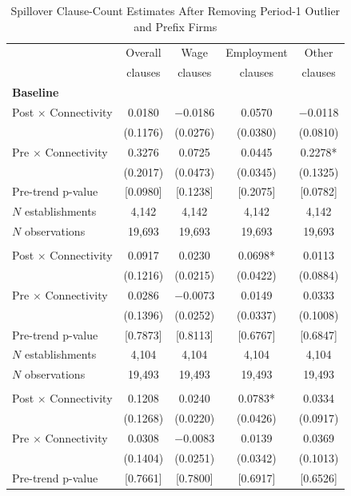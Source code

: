 \begin{table}[!htbp]
\centering
\caption{Spillover Clause-Count Estimates After Removing Period-1 Outlier and Prefix Firms}
\label{tab:numb_clause_outlier_spillover_results}
\scriptsize
\begin{tabular}{lcccc}
\toprule
 & Overall & Wage & Employment & Other \\
 & clauses & clauses & clauses & clauses \\
\midrule
\multicolumn{5}{l}{\textbf{Baseline}}\\
Post $\times$ Connectivity & 0.0180 & $-$0.0186 & 0.0570 & $-$0.0118\\
 & (0.1176) & (0.0276) & (0.0380) & (0.0810)\\
Pre $\times$ Connectivity & 0.3276 & 0.0725 & 0.0445 & 0.2278*\\
 & (0.2017) & (0.0473) & (0.0345) & (0.1325)\\
Pre-trend p-value & [0.0980] & [0.1238] & [0.2075] & [0.0782]\\
$N$ establishments & 4{,}142 & 4{,}142 & 4{,}142 & 4{,}142\\
$N$ observations & 19{,}693 & 19{,}693 & 19{,}693 & 19{,}693\\
\addlinespace
\multicolumn{5}{l}{\textbf{Drop top-1\% firms}}\\
Post $\times$ Connectivity & 0.0917 & 0.0230 & 0.0698* & 0.0113\\
 & (0.1216) & (0.0215) & (0.0422) & (0.0884)\\
Pre $\times$ Connectivity & 0.0286 & $-$0.0073 & 0.0149 & 0.0333\\
 & (0.1396) & (0.0252) & (0.0337) & (0.1008)\\
Pre-trend p-value & [0.7873] & [0.8113] & [0.6767] & [0.6847]\\
$N$ establishments & 4{,}104 & 4{,}104 & 4{,}104 & 4{,}104\\
$N$ observations & 19{,}493 & 19{,}493 & 19{,}493 & 19{,}493\\
\addlinespace
\multicolumn{5}{l}{\textbf{Drop prefix 10877926 firms}}\\
Post $\times$ Connectivity & 0.1208 & 0.0240 & 0.0783* & 0.0334\\
 & (0.1268) & (0.0220) & (0.0426) & (0.0917)\\
Pre $\times$ Connectivity & 0.0308 & $-$0.0083 & 0.0139 & 0.0369\\
 & (0.1404) & (0.0251) & (0.0342) & (0.1013)\\
Pre-trend p-value & [0.7661] & [0.7800] & [0.6917] & [0.6526]\\

\end{tabular}
\end{table}
